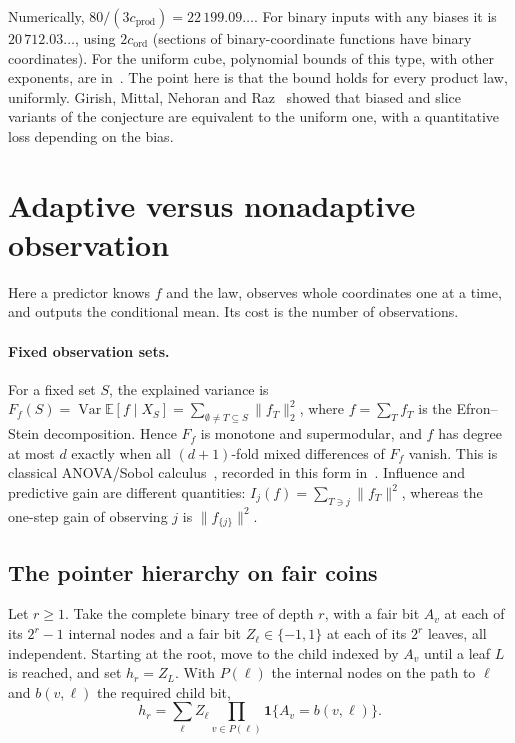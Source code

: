 \documentclass[11pt]{article}
\numberwithin{equation}{section}
\theoremstyle{definition}
\theoremstyle{remark}
\newcommand{\E}{\mathbb{E}}
\newcommand{\1}{\mathbf 1}
\newcommand{\Var}{\operatorname{Var}}
\newcommand{\cprod}{c_{\mathrm{prod}}}
\newcommand{\cord}{c_{\mathrm{ord}}}
\begin{document}
Numerically, $80/(3\cprod)=22\,199.09\ldots$. For binary inputs with any biases it is $20\,712.03\ldots$, using $2\cord$ (sections of binary-coordinate functions have binary coordinates). For the uniform cube, polynomial bounds of this type, with other exponents, are in~\cite{Tur26,HMP26}. The point here is that the bound holds for every product law, uniformly. Girish, Mittal, Nehoran and Raz~\cite{GMNR26} showed that biased and slice variants of the conjecture are equivalent to the uniform one, with a quantitative loss depending on the bias.

\section{Adaptive versus nonadaptive observation}\label{sec:observe}

Here a predictor knows $f$ and the law, observes whole coordinates one at a time, and outputs the conditional mean. Its cost is the number of observations.

\paragraph{Fixed observation sets.} For a fixed set $S$, the explained variance is $F_f(S)=\Var\E[f\mid X_S]=\sum_{\emptyset\ne T\subseteq S}\|f_T\|_2^2$, where $f=\sum_Tf_T$ is the Efron--Stein decomposition. Hence $F_f$ is monotone and supermodular, and $f$ has degree at most $d$ exactly when all $(d+1)$-fold mixed differences of $F_f$ vanish. This is classical ANOVA/Sobol calculus~\cite{Hoe48,ES81,Sob93}, recorded in this form in~\cite{WriAO}. Influence and predictive gain are different quantities: $I_j(f)=\sum_{T\ni j}\|f_T\|^2$, whereas the one-step gain of observing $j$ is $\|f_{\{j\}}\|^2$.

\subsection{The pointer hierarchy on fair coins}
Let $r\ge1$. Take the complete binary tree of depth $r$, with a fair bit $A_v$ at each of its $2^r-1$ internal nodes and a fair bit $Z_\ell\in\{-1,1\}$ at each of its $2^r$ leaves, all independent. Starting at the root, move to the child indexed by $A_v$ until a leaf $L$ is reached, and set $h_r=Z_L$. With $P(\ell)$ the internal nodes on the path to $\ell$ and $b(v,\ell)$ the required child bit,
\begin{equation}\label{eq:pointer}
h_r=\sum_{\ell}Z_\ell\prod_{v\in P(\ell)}\1\{A_v=b(v,\ell)\}.
\end{equation}
\end{document}
